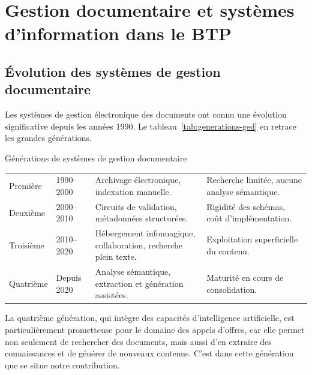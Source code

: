 \section{Gestion documentaire et systèmes d'information dans le BTP}
\label{sec:ch1-ged}

\subsection{Évolution des systèmes de gestion documentaire}

Les systèmes de gestion électronique des documents ont connu une évolution
significative depuis les années 1990. Le tableau~\ref{tab:generations-ged}
en retrace les grandes générations.

\begin{btptable}{Générations de systèmes de gestion documentaire}
\label{tab:generations-ged}
\begin{tabularx}{\linewidth}{@{}L{2.5cm} L{1.9cm} Y Y@{}}
\toprule
{}
 &  &  &  \\
\midrule
Première & 1990--2000 & Archivage électronique, indexation manuelle. & Recherche limitée, aucune analyse sémantique. \\
Deuxième & 2000--2010 & Circuits de validation, métadonnées structurées. & Rigidité des schémas, coût d'implémentation. \\
Troisième & 2010--2020 & Hébergement infonuagique, collaboration, recherche plein texte. & Exploitation superficielle du contenu. \\
Quatrième & Depuis 2020 & Analyse sémantique, extraction et génération assistées. & Maturité en cours de consolidation. \\
\bottomrule
\end{tabularx}
\end{btptable}

La quatrième génération, qui intègre des capacités d'intelligence artificielle,
est particulièrement prometteuse pour le domaine des appels d'offres, car elle
permet non seulement de rechercher des documents, mais aussi d'en extraire des
connaissances et de générer de nouveaux contenus. C'est dans cette génération
que se situe notre contribution.

